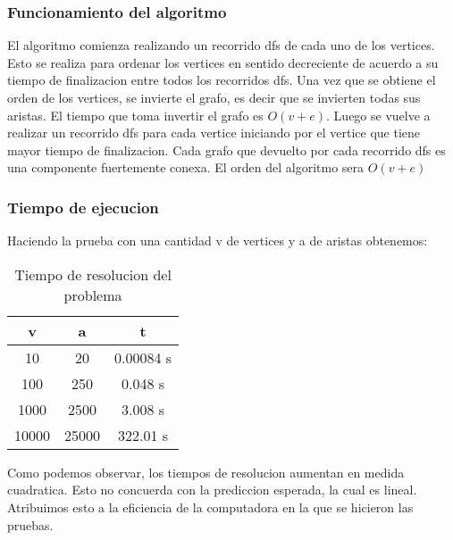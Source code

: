 \documentclass{article}
\begin{document}
            \subsubsection{Funcionamiento del algoritmo}
                El algoritmo comienza realizando un recorrido dfs de cada uno de los
                vertices. Esto se realiza para ordenar los vertices en sentido
                decreciente de acuerdo a su tiempo de finalizacion entre todos los
                recorridos dfs. Una vez que se obtiene el orden de los vertices,
                se invierte el grafo, es decir que se invierten todas sus aristas.
                El tiempo que toma invertir el grafo es $O(v+e)$. Luego se vuelve a
                realizar un recorrido dfs para cada vertice iniciando por el vertice
                que tiene mayor tiempo de finalizacion. Cada grafo que devuelto por cada
                recorrido dfs es una componente fuertemente conexa.
                El orden del algoritmo sera $O(v+e)$

            \subsubsection{Tiempo de ejecucion}
              Haciendo la prueba con una cantidad v de vertices y a de aristas obtenemos:
                \begin{table}[h!]
                    \centering
                    \caption{Tiempo de resolucion del problema}
                    \begin{tabular}{c|c|c}
                        v & a & t \\
                        \hline
                        10 & 20 & 0.00084 s \\
                        \hline
                        100 & 250 & 0.048 s \\
                        \hline
                        1000 & 2500 & 3.008 s \\
                        \hline
                        10000 & 25000 & 322.01 s
                    \end{tabular}
                \end{table}

                Como podemos observar, los tiempos de resolucion aumentan en medida
                cuadratica. Esto no concuerda con la prediccion esperada, la cual es
                lineal. Atribuimos esto a la eficiencia de la computadora en la que
                se hicieron las pruebas.
\end{document}
